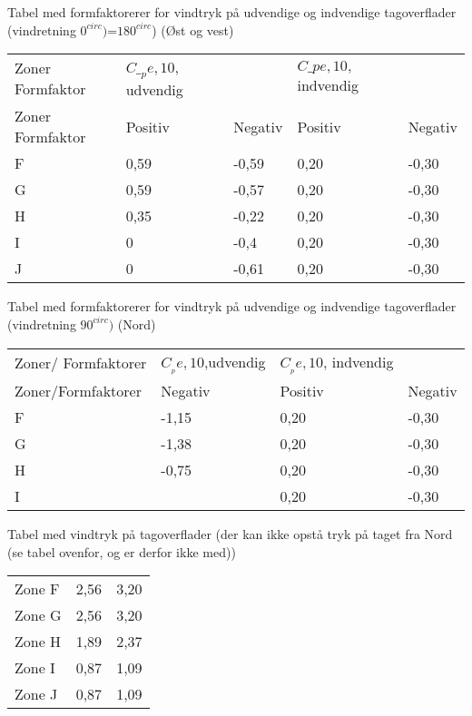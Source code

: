 Tabel med formfaktorerer for vindtryk på udvendige og indvendige tagoverflader (vindretning $0^{circ})$=$180^{circ}$) (Øst og vest)

\begin{table}[h]
\begin{tabular}{lllll}
Zoner Formfaktor & $C\__pe,10$, udvendig &         & $C\_pe,10,$indvendig &         \\
Zoner Formfaktor & Positiv             & Negativ & Positiv             & Negativ \\
F                & 0,59                & -0,59   & 0,20                 & -0,30    \\
G                & 0,59                & -0,57   & 0,20                 & -0,30    \\
H                & 0,35                & -0,22   & 0,20                 & -0,30    \\
I                & 0                   & -0,4    & 0,20                 & -0,30    \\
J                & 0                   & -0,61   & 0,20                 & -0,30   
\end{tabular}
\end{table}


Tabel med formfaktorerer for vindtryk på udvendige og indvendige tagoverflader (vindretning $90^{circ})$ (Nord)

\begin{table}[h]
	\begin{tabular}{llll}
		Zoner/ Formfaktorer & $C__pe,10$,udvendig & $C__pe,10$, indvendig &         \\
		Zoner/Formfaktorer  & Negativ             & Positiv               & Negativ \\
		F                   & -1,15               & 0,20                  & -0,30   \\
		G                   & -1,38               & 0,20                  & -0,30   \\
		H                   & -0,75               & 0,20                  & -0,30   \\
		I                   &                     & 0,20                  & -0,30  
	\end{tabular}
\end{table}


Tabel med vindtryk på tagoverflader (der kan ikke opstå tryk på taget fra Nord (se tabel ovenfor, og er derfor ikke med))
\begin{table}[h]
	\begin{tabular}{lll}
		Zone F                                                     & 2,56 & 3,20 \\
		Zone G                                                     & 2,56 & 3,20 \\
		Zone H                                                     & 1,89 & 2,37 \\
		Zone I                                                     & 0,87 & 1,09 \\
		Zone J                                                     & 0,87 & 1,09
	\end{tabular}
\end{table}

